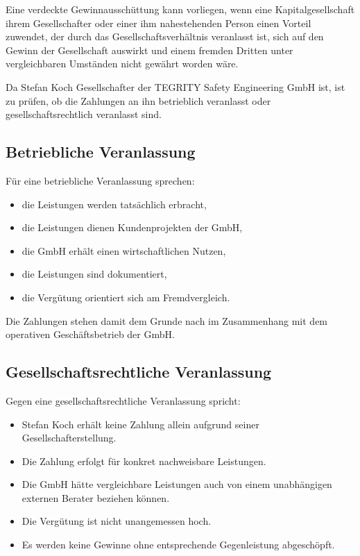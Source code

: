 \documentclass[11pt,a4paper]{article}
\begin{document}
Eine verdeckte Gewinnausschüttung kann vorliegen, wenn eine Kapitalgesellschaft ihrem Gesellschafter oder einer ihm nahestehenden Person einen Vorteil zuwendet, der durch das Gesellschaftsverhältnis veranlasst ist, sich auf den Gewinn der Gesellschaft auswirkt und einem fremden Dritten unter vergleichbaren Umständen nicht gewährt worden wäre.

Da Stefan Koch Gesellschafter der TEGRITY Safety Engineering GmbH ist, ist zu prüfen, ob die Zahlungen an ihn betrieblich veranlasst oder gesellschaftsrechtlich veranlasst sind.

\subsection{Betriebliche Veranlassung}

Für eine betriebliche Veranlassung sprechen:

\begin{itemize}
    \item die Leistungen werden tatsächlich erbracht,
    \item die Leistungen dienen Kundenprojekten der GmbH,
    \item die GmbH erhält einen wirtschaftlichen Nutzen,
    \item die Leistungen sind dokumentiert,
    \item die Vergütung orientiert sich am Fremdvergleich.
\end{itemize}

Die Zahlungen stehen damit dem Grunde nach im Zusammenhang mit dem operativen Geschäftsbetrieb der GmbH.

\subsection{Gesellschaftsrechtliche Veranlassung}

Gegen eine gesellschaftsrechtliche Veranlassung spricht:

\begin{itemize}
    \item Stefan Koch erhält keine Zahlung allein aufgrund seiner Gesellschafterstellung.
    \item Die Zahlung erfolgt für konkret nachweisbare Leistungen.
    \item Die GmbH hätte vergleichbare Leistungen auch von einem unabhängigen externen Berater beziehen können.
    \item Die Vergütung ist nicht unangemessen hoch.
    \item Es werden keine Gewinne ohne entsprechende Gegenleistung abgeschöpft.
\end{itemize}
\end{document}

